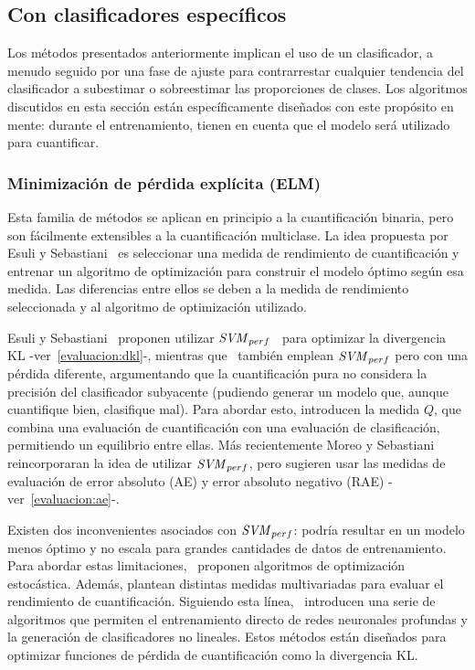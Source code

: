\subsection{Con clasificadores específicos}\label{estimacion:especificos}

Los métodos presentados anteriormente implican el uso de un clasificador, a
menudo seguido por una fase de ajuste para contrarrestar cualquier tendencia del
clasificador a subestimar o sobreestimar las proporciones de clases. Los
algoritmos discutidos en esta sección están específicamente diseñados con este
propósito en mente: durante el entrenamiento, tienen en cuenta que el modelo
será utilizado para cuantificar.

\subsubsection{Minimización de pérdida explícita (ELM)}\label{estimacion:elm}

Esta familia de métodos se aplican en principio a la cuantificación binaria,
pero son fácilmente extensibles a la cuantificación multiclase. La idea
propuesta por Esuli y Sebastiani~\cite{esuli2010sentiment} es seleccionar una
medida de rendimiento de cuantificación y entrenar un algoritmo de optimización
para construir el modelo óptimo según esa medida. Las diferencias entre ellos se
deben a la medida de rendimiento seleccionada y al algoritmo de optimización
utilizado.

Esuli y Sebastiani~\cite{esuli2010sentiment, esuli2014explicit,
esuli2015optimizing} proponen utilizar \({\it SVM
\/}_{perf}\)~\cite{joachims2005support} para optimizar la divergencia KL
-ver~\ref{evaluacion:dkl}-, mientras que~\citet{barranquero2015quantification}
también emplean \({\it SVM \/}_{perf}\) pero con una pérdida diferente,
argumentando que la cuantificación pura no considera la precisión del
clasificador subyacente (pudiendo generar un modelo que, aunque cuantifique
bien, clasifique mal). Para abordar esto, introducen la medida \(Q\), que
combina una evaluación de cuantificación con una evaluación de clasificación,
permitiendo un equilibrio entre ellas. Más recientemente Moreo y
Sebastiani~\cite{moreo2021re} reincorporaran la idea de utilizar \({\it SVM
\/}_{perf}\), pero sugieren usar las medidas de evaluación de error absoluto
(AE) y error absoluto negativo (RAE) -ver~\ref{evaluacion:ae}-.

Existen dos inconvenientes asociados con \({\it SVM \/}_{perf}\): podría
resultar en un modelo menos óptimo y no escala para grandes cantidades de datos
de entrenamiento. Para abordar estas limitaciones,~\citet{kar2016online}
proponen algoritmos de optimización estocástica. Además, plantean distintas
medidas multivariadas para evaluar el rendimiento de cuantificación. Siguiendo
esta línea,~\citet{sanyal2018optimizing} introducen una serie de algoritmos que
permiten el entrenamiento directo de redes neuronales profundas y la generación
de clasificadores no lineales. Estos métodos están diseñados para optimizar
funciones de pérdida de cuantificación como la divergencia KL.\@

